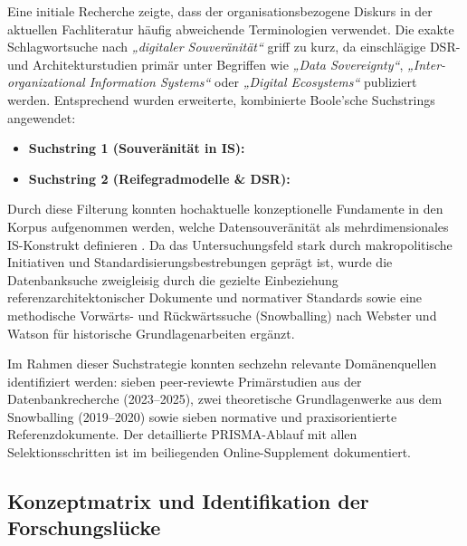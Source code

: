 \documentclass[10pt,a4paper]{article}
\begin{document}
Eine initiale Recherche zeigte, dass der organisationsbezogene Diskurs in der aktuellen Fachliteratur häufig abweichende Terminologien verwendet. Die exakte Schlagwortsuche nach \textit{„digitaler Souveränität“} griff zu kurz, da einschlägige DSR- und Architekturstudien primär unter Begriffen wie \textit{„Data Sovereignty“}, \textit{„Inter-organizational Information Systems“} oder \textit{„Digital Ecosystems“} publiziert werden. Entsprechend wurden erweiterte, kombinierte Boole'sche Suchstrings angewendet:
\begin{itemize}[leftmargin=1.8em,itemsep=0.1em]
  \item \textbf{Suchstring 1 (Souveränität in IS):}\newline
  {\small\ttfamily{}\newline{}}
  \item \textbf{Suchstring 2 (Reifegradmodelle \& DSR):}\newline
  {\small\ttfamily{}\newline{}}
\end{itemize}

Durch diese Filterung konnten hochaktuelle konzeptionelle Fundamente in den Korpus aufgenommen werden, welche Datensouveränität als mehrdimensionales IS-Konstrukt definieren \cite{SHO24,Ab24}. Da das Untersuchungsfeld stark durch makropolitische Initiativen und Standardisierungsbestrebungen geprägt ist, wurde die Datenbanksuche zweigleisig durch die gezielte Einbeziehung referenzarchitektonischer Dokumente und normativer Standards \cite{BM24a,BM24b,BT24,Ga23,ID23,OE23,Ze26} sowie eine methodische Vorwärts- und Rückwärtssuche (Snowballing) nach Webster und Watson \cite{WW02} für historische Grundlagenarbeiten \cite{OJ19,PT20} ergänzt.

Im Rahmen dieser Suchstrategie konnten sechzehn relevante Domänenquellen identifiziert werden: sieben peer-reviewte Primärstudien aus der Datenbankrecherche (2023--2025), zwei theoretische Grundlagenwerke aus dem Snowballing (2019--2020) sowie sieben normative und praxisorientierte Referenzdokumente. Der detaillierte PRISMA-Ablauf mit allen Selektionsschritten ist im beiliegenden Online-Supplement dokumentiert.

\subsection{Konzeptmatrix und Identifikation der Forschungslücke}
\end{document}
